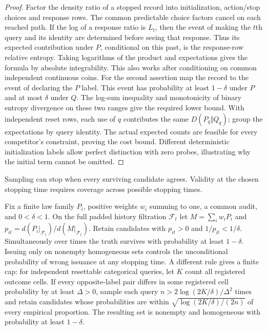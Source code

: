 \begin{proof}

Factor the density ratio of a stopped record into initialization, action/stop choices and response rows. The common predictable choice factors cancel on each reached path. If the log of a response ratio is \(L_t\), then the event of making the \(t\)th query and its identity are determined before seeing that response. Thus its expected contribution under \(P\), conditional on this past, is the response-row relative entropy. Taking logarithms of the product and expectations gives the formula by absolute integrability. This also works after conditioning on common independent continuous coins. For the second assertion map the record to the event of declaring the \(P\) label. This event has probability at least \(1-\delta\) under \(P\) and at most \(\delta\) under \(Q\). The log-sum inequality and monotonicity of binary entropy divergence on these two ranges give the required lower bound. With independent reset rows, each use of \(q\) contributes the same \(D(P_q\Vert Q_q)\); group the expectations by query identity. The actual expected counts are feasible for every competitor's constraint, proving the cost bound. Different deterministic initialization labels allow perfect distinction with zero probes, illustrating why the initial term cannot be omitted.

\end{proof}

Sampling can stop when every surviving candidate agrees. Validity at the chosen stopping time requires coverage across possible stopping times.

\begin{theorem}\label{thm:t23}

Fix a finite law family \(P_i\), positive weights \(w_i\) summing to one, a common audit, and \(0<\delta<1\). On the full padded history filtration \(\mathcal F_t\) let \(M=\sum_iw_iP_i\) and \(p_{it}=d(P_i|_{\mathcal F_t})/d(M|_{\mathcal F_t})\). Retain candidates with \(p_{it}>0\) and \(1/p_{it}<1/\delta\). Simultaneously over times the truth survives with probability at least \(1-\delta\). Issuing only on nonempty homogeneous sets controls the unconditional probability of wrong issuance at any stopping time. A different rule gives a finite cap: for independent resettable categorical queries, let \(K\) count all registered outcome cells. If every opposite-label pair differs in some registered cell probability by at least \(\Delta>0\), sample each query \(n>2\log(2K/\delta)/\Delta^2\) times and retain candidates whose probabilities are within \(\sqrt{\log(2K/\delta)/(2n)}\) of every empirical proportion. The resulting set is nonempty and homogeneous with probability at least \(1-\delta\).

\end{theorem}

